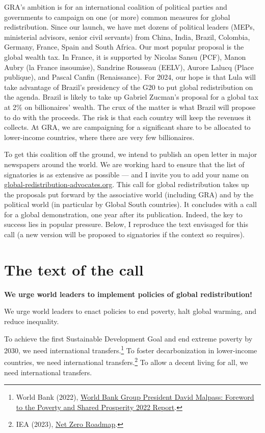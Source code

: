 \documentclass[a5paper,english,openany]{memoir}
\begin{document}
GRA's ambition is for an international coalition of political parties and governments to campaign on one (or more) common measures for global redistribution. Since our launch, we have met dozens of political leaders (MEPs, ministerial advisors, senior civil servants) from China, India, Brazil, Colombia, Germany, France, Spain and South Africa. Our most popular proposal is the global wealth tax. In France, it is supported by Nicolas Sansu (PCF), Manon Aubry (la France insoumise), Sandrine Rousseau (EELV), Aurore Lalucq (Place publique), and Pascal Canfin (Renaissance). %
For 2024, our hope is that Lula will take advantage of Brazil's presidency of the G20 to put global redistribution on the agenda. Brazil is likely to take up Gabriel Zucman's proposal for a global tax at 2\% on billionaires' wealth. The crux of the matter is what Brazil will propose to do with the proceeds. The risk is that each country will keep the revenues it collects. At GRA, we are campaigning for a significant share to be allocated to lower-income countries, where there are very few billionaires.

To get this coalition off the ground, we intend to publish an open letter in major newspapers around the world. We are working hard to ensure that the list of signatories is as extensive as possible --- and I invite you to add your name on \href{https://global-redistribution-advocates.org/fr/signer-les-petitions}{global-redistribution-advocates.org}. This call for global redistribution takes up the proposals put forward by the associative world (including GRA) and by the political world (in particular by Global South countries). It concludes with a call for a global demonstration, one year after its publication. Indeed, the key to success lies in popular pressure. Below, I reproduce the text envisaged for this call (a new version will be proposed to signatories if the context so requires).%

\section{The text of the call}

\begin{center}
\textbf{We urge world leaders to implement policies of global redistribution!}
\end{center}

We urge world leaders to enact policies to end poverty, halt global warming, and reduce inequality. 

To achieve the first Sustainable Development Goal and end extreme poverty by 2030, we need international transfers.\footnote{World Bank (2022), \href{https://www.worldbank.org/en/news/statement/2022/10/05/world-bank-group-president-david-malpass-foreword-to-the-poverty-and-shared-prosperity-report}{World Bank Group President David Malpass: Foreword to the Poverty and Shared Prosperity 2022 Report}.} 
To foster decarbonization in lower-income countries, we need international transfers.\footnote{IEA (2023), \href{https://www.iea.org/reports/net-zero-roadmap-a-global-pathway-to-keep-the-15-0c-goal-in-reach/}{Net Zero Roadmap}.} 
To allow a decent living for all, we need international transfers.
\end{document}
